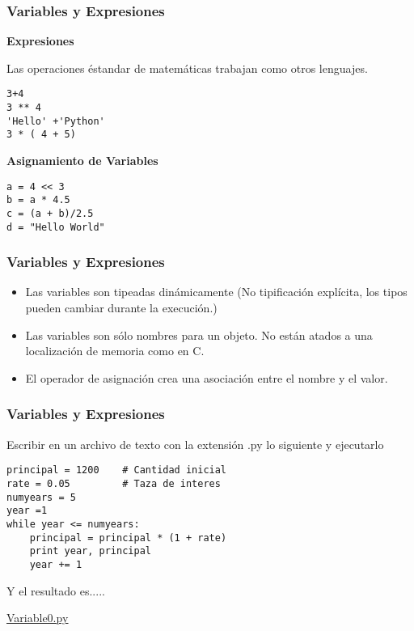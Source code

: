 \documentclass[10pt]{beamer}
\begin{document}
\begin{frame}[fragile]
\frametitle{Variables y Expresiones}
\vspace{0.2cm}

\textbf{Expresiones}
\vspace{0.2cm}

Las operaciones \'estandar de matem\'aticas trabajan como otros lenguajes.
\begin{lstlisting}
3+4
3 ** 4
'Hello' +'Python'
3 * ( 4 + 5)
\end{lstlisting}

\textbf{Asignamiento de Variables}
\vspace{0.2cm}

\begin{lstlisting}
a = 4 << 3
b = a * 4.5
c = (a + b)/2.5
d = "Hello World"
\end{lstlisting}

\end{frame}


\begin{frame}[fragile]
\frametitle{Variables y Expresiones}
\begin{itemize}
\item Las variables son tipeadas din\'amicamente (No tipificaci\'on expl\'icita, los tipos pueden cambiar durante la execuci\'on.)
\item Las variables son s\'olo nombres para un objeto. No est\'an atados a una localizaci\'on de memoria como en C.

\item El operador de asignaci\'on crea una asociaci\'on entre el nombre y el valor. 
\end{itemize}
\end{frame}

\begin{frame}[fragile]
\frametitle{Variables y Expresiones}
Escribir en un archivo de texto con la extensi\'on .py lo siguiente y ejecutarlo

\vspace{0.3cm}


\begin{lstlisting}
principal = 1200    # Cantidad inicial 
rate = 0.05         # Taza de interes
numyears = 5        
year =1
while year <= numyears:
    principal = principal * (1 + rate)
    print year, principal
    year += 1
\end{lstlisting}

\vspace{0.3cm}

Y el resultado es.....

\vspace{0.2cm}

\href{run:ejemplo1.py}{\underline{Variable0.py}}
\end{frame}
\end{document}
